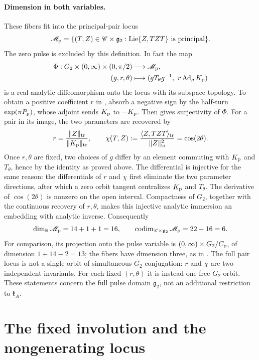 \documentclass[11pt,a4paper]{article}
\newcommand{\RR}{\mathbb R}
\newcommand{\Lie}{\operatorname{Lie}}
\newcommand{\Ad}{\operatorname{Ad}}
\begin{document}
\paragraph{Dimension in both variables.}
These fibers fit into the principal-pair locus
\[
\mathscr M_{\rm p}
 =\{(T,Z)\in\mathscr C\times\mathfrak g_2:
       \Lie\{Z,TZT\}\text{ is principal}\}.
\]
The zero pulse is excluded by this definition.  In fact the map
\[
\begin{split}
\Phi:G_2\times(0,\infty)\times(0,\pi/2)&\longrightarrow\mathscr M_{\rm p},\\
(g,r,\theta)&\longmapsto
       (gT_\theta g^{-1},\ r\Ad_g K_{\rm p})
\end{split}
\]
is a real-analytic diffeomorphism onto the locus with its subspace topology.
To obtain a positive coefficient $r$ in , absorb a negative sign by the half-turn $\exp(\pi P_{\rm p})$, whose adjoint sends $K_{\rm p}$ to $-K_{\rm p}$.
Then  gives surjectivity of $\Phi$.
For a pair in its image, the two parameters are recovered by
\[
r=\frac{\|Z\|_{\rm tr}}{\|K_{\rm p}\|_{\rm tr}},\qquad
\chi(T,Z):=\frac{\langle Z,TZT\rangle_{\rm tr}}{\|Z\|_{\rm tr}^2}
                 =\cos(2\theta).
\]
Once $r,\theta$ are fixed, two choices of $g$ differ by an element commuting with $K_{\rm p}$ and $T_\theta$, hence by the identity as proved above.
The differential is injective for the same reason: the differentials of $r$ and $\chi$ first eliminate the two parameter directions, after which a zero orbit tangent centralizes $K_{\rm p}$ and $T_\theta$.
The derivative of $\cos(2\theta)$ is nonzero on the open interval.
Compactness of $G_2$, together with the continuous recovery of $r,\theta$, makes this injective analytic immersion an embedding with analytic inverse.
Consequently
\[
\dim_{\RR}\mathscr M_{\rm p}=14+1+1=16,
\qquad
\operatorname{codim}_{\mathscr C\times\mathfrak g_2}\mathscr M_{\rm p}
       =22-16=6.
\]
For comparison, its projection onto the pulse variable is
$(0,\infty)\times G_2/C_{\rm p}$, of dimension $1+14-2=13$;
the fibers have dimension three, as in .
The full pair locus is not a single orbit of simultaneous $G_2$ conjugation: $r$ and $\chi$ are two independent invariants.
For each fixed $(r,\theta)$ it is instead one free $G_2$ orbit.
These statements concern the full pulse domain $\mathfrak g_2$, not an additional restriction to $\mathfrak k_A$.


\section{The fixed involution and the nongenerating locus}
\label{sec:failure}
\end{document}

